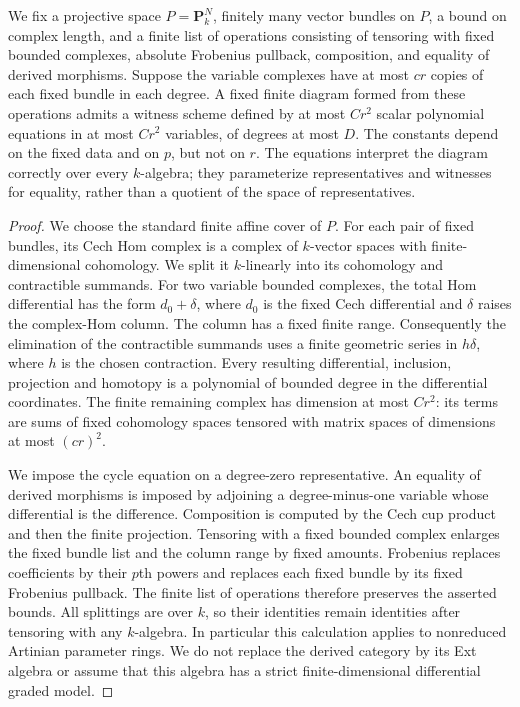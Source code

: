 \begin{lemma}
\label{D:polynomial-monad-diagrams}
We fix a projective space $P=\mathbf P^N_k$, finitely many vector bundles
on $P$, a bound on complex length, and a finite list of operations
consisting of tensoring with fixed bounded complexes, absolute Frobenius
pullback, composition, and equality of derived morphisms. Suppose the
variable complexes have at most $cr$ copies of each fixed bundle in each
degree. A fixed finite diagram formed from these operations admits a
witness scheme defined by at most $Cr^2$ scalar polynomial equations in
at most $Cr^2$ variables, of degrees at most $D$. The constants depend
on the fixed data and on $p$, but not on $r$. The equations interpret
the diagram correctly over every $k$-algebra; they parameterize
representatives and witnesses for equality, rather than a quotient of
the space of representatives.
\end{lemma}
\begin{proof}
We choose the standard finite affine cover of $P$. For each pair of
fixed bundles, its Cech Hom complex is a complex of $k$-vector spaces
with finite-dimensional cohomology. We split it $k$-linearly into its
cohomology and contractible summands. For two variable bounded complexes,
the total Hom differential has the form $d_0+\delta$, where $d_0$ is
the fixed Cech differential and $\delta$ raises the complex-Hom column.
The column has a fixed finite range. Consequently the elimination of
the contractible summands uses a finite geometric series in $h\delta$,
where $h$ is the chosen contraction. Every resulting differential,
inclusion, projection and homotopy is a polynomial of bounded degree
in the differential coordinates. The finite remaining complex has
dimension at most $Cr^2$: its terms are sums of fixed cohomology spaces
tensored with matrix spaces of dimensions at most $(cr)^2$.

We impose the cycle equation on a degree-zero representative. An equality
of derived morphisms is imposed by adjoining a degree-minus-one variable
whose differential is the difference. Composition is computed by the
Cech cup product and then the finite projection. Tensoring with a fixed
bounded complex enlarges the fixed bundle list and the column range by
fixed amounts. Frobenius replaces coefficients by their $p$th powers
and replaces each fixed bundle by its fixed Frobenius pullback. The
finite list of operations therefore preserves the asserted bounds.
All splittings are over $k$, so their identities remain identities
after tensoring with any $k$-algebra. In particular this calculation
applies to nonreduced Artinian parameter rings. We do not replace the
derived category by its Ext algebra or assume that this algebra has a
strict finite-dimensional differential graded model.
\end{proof}

